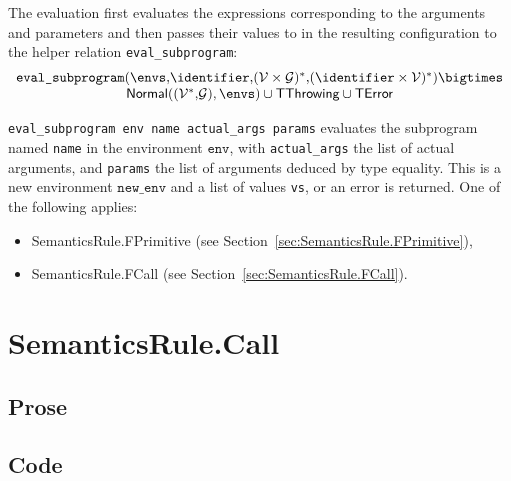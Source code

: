 \documentclass{book}
\newcommand\secref[1]{Section~\ref{sec:#1}}
\newcommand\XGraphs[0]{\mathcal{G}}
\newcommand\vals[0]{\mathcal{V}}
\newcommand\aslrel[0]{\bigtimes}
\newcommand\aslsep[0]{\mathbf{,}}
\newcommand\TError[0]{\textsf{TError}}
\newcommand\TThrowing[0]{\textsf{TThrowing}}
\newcommand\evalsubprogram[1]{\texttt{eval\_subprogram}(#1)}
\newcommand\Normal[0]{\textsf{Normal}}
\newcommand\newenv[0]{\texttt{new\_env}}
\newcommand\env[0]{\texttt{env}}
\begin{document}
The evaluation first evaluates the expressions corresponding to the arguments
and parameters and then passes their values to in the resulting configuration
to the helper relation \texttt{eval\_subprogram}:
\[
  \begin{array}{c}
    \evalsubprogram{\envs \aslsep \identifier \aslsep (\vals \times \XGraphs)^* \aslsep (\identifier\times\vals)^*} \aslrel \\
    \Normal((\vals^* \aslsep \XGraphs), \envs) \cup \TThrowing \cup \TError
  \end{array}
\]

\texttt{eval\_subprogram env name actual\_args params} evaluates the subprogram \\
named \texttt{name} in the environment $\env$, with
\texttt{actual\_args} the list of actual arguments, and \texttt{params} the
list of arguments deduced by type equality. This is a new environment
$\newenv$ and a list of values \texttt{vs}, or an error is returned.
One of the following applies:
\begin{itemize}
\item SemanticsRule.FPrimitive (see \secref{SemanticsRule.FPrimitive}),
\item SemanticsRule.FCall (see \secref{SemanticsRule.FCall}).
\end{itemize}

\section{SemanticsRule.Call \label{sec:SemanticsRule.Call}}

\subsection{Prose}

\subsection{Code}
\end{document}

